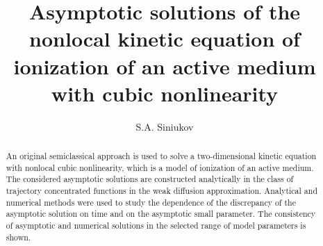 \begin{englishtitle} %
\title{Asymptotic solutions of the nonlocal kinetic equation of ionization of an active medium with cubic nonlinearity}
\author{S.A. Siniukov
}


\maketitle

\begin{abstract}
An original semiclassical approach is used to solve a two-dimensional kinetic equation with nonlocal cubic nonlinearity, which is a model of ionization of an active medium. The considered asymptotic solutions are constructed analytically in the class of trajectory concentrated functions in the weak diffusion approximation. Analytical and numerical methods were used to study the dependence of the discrepancy of the asymptotic solution on time and on the asymptotic small parameter. The consistency of asymptotic and numerical solutions in the selected range of model parameters is shown.

\end{abstract}
\end{englishtitle}

\iffalse
%
%



\documentclass[12pt]{llncs}

\usepackage{iftex}

\ifPDFTeX
\usepackage[T2A]{fontenc}
\usepackage[utf8]{inputenc} %
\usepackage[english,russian]{babel}
\fi

